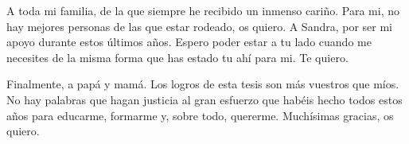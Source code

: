 \begin{acknowledgements}
A toda mi familia, de la que siempre he recibido un inmenso cariño.
Para mi, no hay mejores personas de las que estar rodeado, os quiero.
A Sandra, por ser mi apoyo durante estos últimos años.
Espero poder estar a tu lado cuando me necesites de la misma forma que has estado tu ahí para mi.
Te quiero.

Finalmente, a papá y mamá.
Los logros de esta tesis son más vuestros que míos.
No hay palabras que hagan justicia al gran esfuerzo que habéis hecho todos estos años para educarme, formarme y, sobre todo, quererme. Muchísimas gracias, os quiero.

\end{acknowledgements}
